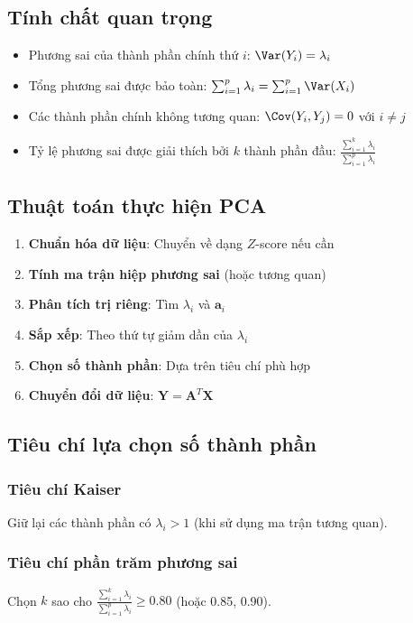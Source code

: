 \subsection{Tính chất quan trọng}
\begin{tinhchat}
\begin{itemize}
    \item Phương sai của thành phần chính thứ $i$: $\Var(Y_i) = \lambda_i$
    \item Tổng phương sai được bảo toàn: $\sum_{i=1}^p \lambda_i = \sum_{i=1}^p \Var(X_i)$
    \item Các thành phần chính không tương quan: $\Cov(Y_i, Y_j) = 0$ với $i \neq j$
    \item Tỷ lệ phương sai được giải thích bởi $k$ thành phần đầu: $\frac{\sum_{i=1}^k \lambda_i}{\sum_{i=1}^p \lambda_i}$
\end{itemize}
\end{tinhchat}

\subsection{Thuật toán thực hiện PCA}
\begin{enumerate}
    \item \textbf{Chuẩn hóa dữ liệu}: Chuyển về dạng $Z$-score nếu cần
    \item \textbf{Tính ma trận hiệp phương sai} (hoặc tương quan)
    \item \textbf{Phân tích trị riêng}: Tìm $\lambda_i$ và $\mathbf{a}_i$
    \item \textbf{Sắp xếp}: Theo thứ tự giảm dần của $\lambda_i$
    \item \textbf{Chọn số thành phần}: Dựa trên tiêu chí phù hợp
    \item \textbf{Chuyển đổi dữ liệu}: $\mathbf{Y} = \mathbf{A}^T\mathbf{X}$
\end{enumerate}

\subsection{Tiêu chí lựa chọn số thành phần}
\subsubsection*{Tiêu chí Kaiser}
Giữ lại các thành phần có $\lambda_i > 1$ (khi sử dụng ma trận tương quan).

\subsubsection*{Tiêu chí phần trăm phương sai}
Chọn $k$ sao cho $\frac{\sum_{i=1}^k \lambda_i}{\sum_{i=1}^p \lambda_i} \geq 0.80$ (hoặc 0.85, 0.90).

